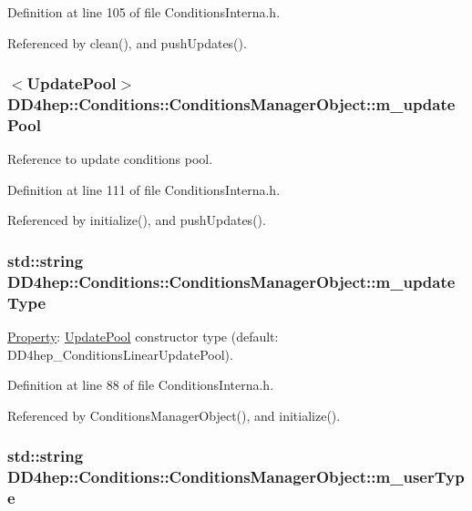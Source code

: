 Definition at line 105 of file ConditionsInterna.h.

Referenced by clean(), and pushUpdates().\hypertarget{class_d_d4hep_1_1_conditions_1_1_conditions_manager_object_a83ef3cf4c818d972d9c8720913c7525b}{
\subsubsection[{m\_\-updatePool}]{$<${\bf UpdatePool}$>$ {\bf DD4hep::Conditions::ConditionsManagerObject::m\_\-updatePool}}}
\label{class_d_d4hep_1_1_conditions_1_1_conditions_manager_object_a83ef3cf4c818d972d9c8720913c7525b}


Reference to update conditions pool. 

Definition at line 111 of file ConditionsInterna.h.

Referenced by initialize(), and pushUpdates().\hypertarget{class_d_d4hep_1_1_conditions_1_1_conditions_manager_object_a015a2e784bea5773c62513f6d24af753}{
\subsubsection[{m\_\-updateType}]{\setlength{\rightskip}{0pt plus 5cm}std::string {\bf DD4hep::Conditions::ConditionsManagerObject::m\_\-updateType}}}
\label{class_d_d4hep_1_1_conditions_1_1_conditions_manager_object_a015a2e784bea5773c62513f6d24af753}


\hyperlink{class_d_d4hep_1_1_property}{Property}: \hyperlink{class_d_d4hep_1_1_conditions_1_1_update_pool}{UpdatePool} constructor type (default: DD4hep\_\-ConditionsLinearUpdatePool). 

Definition at line 88 of file ConditionsInterna.h.

Referenced by ConditionsManagerObject(), and initialize().\hypertarget{class_d_d4hep_1_1_conditions_1_1_conditions_manager_object_abe38ba943a936b6322ec553e53f0c7dd}{
\subsubsection[{m\_\-userType}]{\setlength{\rightskip}{0pt plus 5cm}std::string {\bf DD4hep::Conditions::ConditionsManagerObject::m\_\-userType}}}
\label{class_d_d4hep_1_1_conditions_1_1_conditions_manager_object_abe38ba943a936b6322ec553e53f0c7dd}


